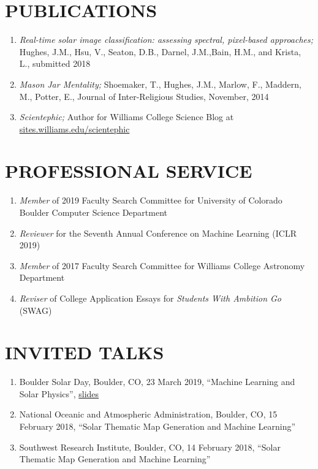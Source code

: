 \documentclass[line,margin]{res}
\begin{document}
\begin{resume}
  \section{PUBLICATIONS}
  \begin{enumerate}[leftmargin=*]
    \item {\sl Real-time solar image classification: assessing  spectral,  pixel-based approaches;} Hughes, J.M., Hsu, V., Seaton, D.B., Darnel, J.M.,Bain, H.M., and Krista, L., submitted 2018
  \item {\sl Mason Jar Mentality;} Shoemaker, T., Hughes, J.M., Marlow, F., Maddern, M., Potter, E.,
    Journal of Inter-Religious Studies, November, 2014
  \item {\sl Scientephic;} Author for Williams College Science Blog at \href{https://sites.williams.edu/scientephic/}{sites.williams.edu/scientephic}

  \end{enumerate}

  
  \section{PROFESSIONAL SERVICE}
  \begin{enumerate}[leftmargin=*]
  \item {\sl Member} of 2019 Faculty Search Committee for University of Colorado Boulder Computer Science Department
  \item {\sl Reviewer} for the Seventh Annual Conference on Machine Learning (ICLR 2019)
  \item {\sl Member} of 2017 Faculty Search Committee for Williams College Astronomy Department
  \item {\sl Reviser} of College Application Essays for \textit{Students With Ambition Go} (SWAG)
  \end{enumerate}

  \section{INVITED TALKS}
  \begin{enumerate}[leftmargin=*]
  \item Boulder Solar Day, Boulder, CO, 23 March 2019, ``Machine Learning and Solar Physics'', \href{https://drive.google.com/open?id=1j5R_wpHwaYO6ZDdx2zjAtdNeyvL2uC9n}{slides}
  \item National Oceanic and Atmospheric Administration, Boulder, CO, 15 February 2018, ``Solar Thematic Map Generation and Machine Learning''
  \item Southwest Research Institute, Boulder, CO, 14 February 2018, ``Solar Thematic Map Generation and Machine Learning''
  \end{enumerate}
  

\end{resume}
\end{document}
